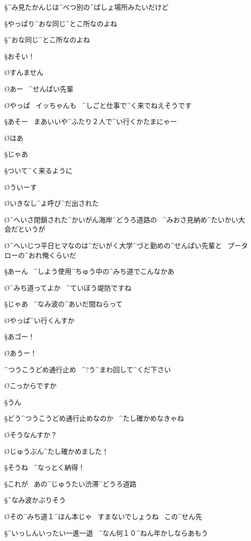 \S ^{み}{見}たかんじは^{べつ}{別}の^{ばしょ}{場所}みたいだけど

\S やっぱり^{おな}{同}じ^{とこ}{所}なのよね

\page
\S ^{おな}{同}じ^{とこ}{所}なのよね

\page[114]
\S おそい！

\O すんません

\O あー
\ ^{せんぱい}{先輩}

\O やっぱ
\ イッちゃんも
\ ^{しごと}{仕事}で^{く}{来}でねえそうです

\S あそー
\ まあいいや^{ふたり}{２人}で^{い}{行}くかたまにゃー

\O はあ

\page
\S じゃあ

\S ついて^{く}{来}るように

\O ういーす

\O いきなし^{よ}{呼}び^{だ}{出}された

\O ^{へいさ}{閉鎖}された^{かいがん}{海岸}^{どうろ}{道路}の
\ ^{みおさ}{見納}め^{たいかい}{大会}だというが

\O ^{へいじつ}{平日}ヒマなのは^{だいがく}{大学}^{づと}{勤}めの^{せんぱい}{先輩}と
\ プータローの^{おれ}{俺}くらいだ

\page
\S あーん
\ ^{しよう}{使用}^{ちゅう}{中}の^{みち}{道}でこんなかあ

\O ^{みち}{道}ってよか
\ ^{ていぼう}{堤防}ですね

\page
\S じゃあ
\ ^{なみ}{波}の^{あいだ}{間}ねらって

\O やっぱ^{い}{行}くんすか

\S あゴー！

\O あうー！

\page
\Sign ^{つうこうどめ}{通行止め}
\ ^{?}{う}^{まわ}{回}して^{くだ}{下}さい

\O こっからですか

\S うん

\S どう^{つうこうどめ}{通行止め}なのか
\ ^{たし}{確}かめなきゃね

\O そうなんすか？

\page
\O じゅうぶん^{たし}{確}かめました！

\S そうね
\ ^{なっとく}{納得}！

\page
\S これが
\ あの^{じゅうたい}{渋滞}^{どうろ}{道路}

\S ^{なみ}{波}かぶりそう

\O その^{みち}{道}１^{ほん}{本}じゃ
\ すまないでしょうね
\ この^{せん}{先}

\S ^{いっしんいったい}{一進一退}
\ ^{なん}{何}１０^{ねん}{年}かしならあもう

